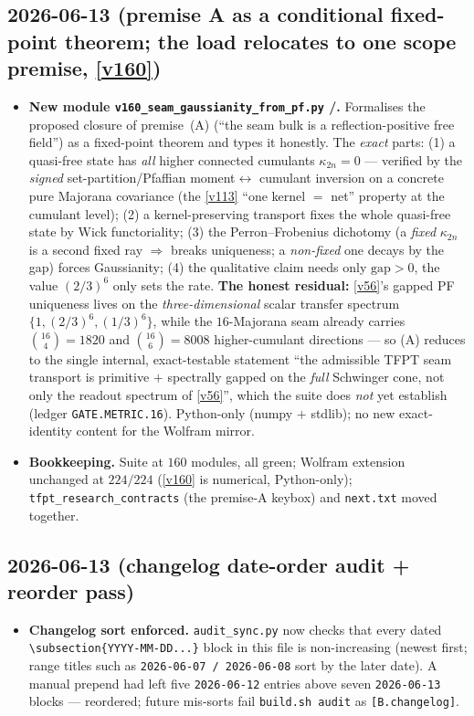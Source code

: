\subsection*{2026-06-13 (premise A as a conditional fixed-point theorem; the load relocates to one scope premise, \vref{v160})}
\begin{itemize}
\item \textbf{New module \texttt{v160\_seam\_gaussianity\_from\_pf.py} \mE/\mO.} Formalises the proposed
  closure of premise~(A) (``the seam bulk is a reflection-positive free field'') as a fixed-point theorem
  and types it honestly. The \emph{exact} parts: (1) a quasi-free state has \emph{all} higher connected
  cumulants $\kappa_{2n}{=}0$ --- verified by the \emph{signed} set-partition/Pfaffian moment$\leftrightarrow$%
  cumulant inversion on a concrete pure Majorana covariance (the \vref{v113} ``one kernel $=$ net'' property
  at the cumulant level); (2) a kernel-preserving transport fixes the whole quasi-free state by Wick
  functoriality; (3) the Perron--Frobenius dichotomy (a \emph{fixed} $\kappa_{2n}$ is a second fixed ray
  $\Rightarrow$ breaks uniqueness; a \emph{non-fixed} one decays by the gap) forces Gaussianity; (4) the
  qualitative claim needs only $\mathrm{gap}{>}0$, the value $(2/3)^6$ only sets the rate. \textbf{The
  honest residual:} \vref{v56}'s gapped PF uniqueness lives on the \emph{three-dimensional} scalar transfer
  spectrum $\{1,(2/3)^6,(1/3)^6\}$, while the $16$-Majorana seam already carries $\binom{16}{4}{=}1820$ and
  $\binom{16}{6}{=}8008$ higher-cumulant directions --- so (A) reduces to the single internal, exact-testable
  statement ``the admissible TFPT seam transport is primitive $+$ spectrally gapped on the \emph{full}
  Schwinger cone, not only the readout spectrum of \vref{v56}'', which the suite does \emph{not} yet
  establish (ledger \texttt{GATE.METRIC.16}). Python-only (numpy $+$ stdlib); no new exact-identity content
  for the Wolfram mirror.
\item \textbf{Bookkeeping.} Suite at $160$ modules, all green; Wolfram extension unchanged at $224/224$
  (\vref{v160} is numerical, Python-only); \texttt{tfpt\_research\_contracts} (the premise-A keybox) and
  \texttt{next.txt} moved together.
\end{itemize}

\subsection*{2026-06-13 (changelog date-order audit + reorder pass)}
\begin{itemize}
\item \textbf{Changelog sort enforced.} \texttt{audit\_sync.py} now checks that every
  dated \texttt{\textbackslash subsection\*\{YYYY-MM-DD...\}} block in this file is
  non-increasing (newest first; range titles such as \texttt{2026-06-07 / 2026-06-08}
  sort by the later date). A manual prepend had left five \texttt{2026-06-12} entries
  above seven \texttt{2026-06-13} blocks --- reordered; future mis-sorts fail
  \texttt{build.sh audit} as \texttt{[B.changelog]}.
\end{itemize}


